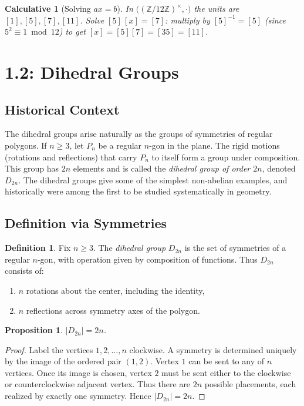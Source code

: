 \documentclass[12pt]{article}
\newtheorem{proposition}[theorem]{Proposition}
\newtheorem{calculative}[theorem]{Calculative}
\theoremstyle{definition}
\newtheorem{definition}{Definition}
\begin{document}
\begin{calculative}[Solving $ax=b$]
In $\big((\mathbb{Z}/12\mathbb{Z})^\times,\cdot\big)$ the units are $[1],[5],[7],[11]$. Solve $[5]\,[x]=[7]$: multiply by $[5]^{-1}=[5]$ (since $5^2\equiv 1\bmod 12$) to get
$[x]=[5][7]=[35]=[11]$.
\end{calculative}

\newpage

\dotfill
\section*{1.2: Dihedral Groups}
\dotfill

\subsection*{Historical Context}
The dihedral groups arise naturally as the groups of symmetries of regular polygons.
If $n\geq 3$, let $P_n$ be a regular $n$-gon in the plane. The rigid motions
(rotations and reflections) that carry $P_n$ to itself form a group under composition.
This group has $2n$ elements and is called the \emph{dihedral group of order $2n$},
denoted $D_{2n}$. The dihedral groups give some of the simplest non-abelian examples,
and historically were among the first to be studied systematically in geometry.

\subsection*{Definition via Symmetries}
\begin{definition}
Fix $n\geq 3$. The \emph{dihedral group} $D_{2n}$ is the set of symmetries of a regular
$n$-gon, with operation given by composition of functions. Thus $D_{2n}$ consists of:
\begin{enumerate}
    \item $n$ rotations about the center, including the identity,
    \item $n$ reflections across symmetry axes of the polygon.
\end{enumerate}
\end{definition}

\begin{proposition}
$|D_{2n}|=2n$.
\end{proposition}

\begin{proof}
Label the vertices $1,2,\dots,n$ clockwise.
A symmetry is determined uniquely by the image of the ordered pair $(1,2)$.
Vertex $1$ can be sent to any of $n$ vertices. Once its image is chosen,
vertex $2$ must be sent either to the clockwise or counterclockwise adjacent vertex.
Thus there are $2n$ possible placements, each realized by exactly one symmetry.
Hence $|D_{2n}|=2n$.
\end{proof}
\end{document}
